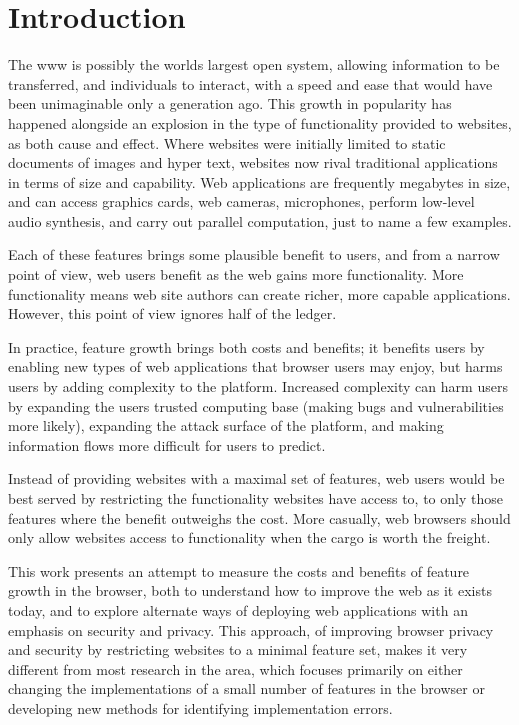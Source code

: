 \chapter{Introduction}
\label{intro}

The \gls{www} is possibly the worlds largest open system, allowing information
to be transferred, and individuals to interact, with a speed and ease that would
have been unimaginable only a generation ago.  This growth in popularity
has happened alongside an explosion in the type of functionality provided to
websites, as both cause and effect.  Where websites were initially limited
to static documents of images and hyper text, websites now rival traditional
applications in terms of size and capability.  Web applications are frequently
megabytes in size, and can access graphics cards, web cameras, microphones,
perform low-level audio synthesis, and carry out parallel computation, just to
name a few examples.

Each of these features brings some plausible benefit to users, and from a
narrow point of view, web users benefit as the web gains more functionality.
More functionality means web site authors can create richer, more capable
applications. However, this point of view ignores half of the ledger.

In practice, feature growth brings both costs and benefits; it benefits users
by enabling new types of web applications that browser users may enjoy, but
harms users by adding complexity to the platform.  Increased complexity
can harm users by expanding the users trusted computing base (making bugs and
vulnerabilities more likely), expanding the attack surface of the platform,
and making information flows more difficult for users to predict.

Instead of providing websites with a maximal set of features, web users would
be best served by restricting the functionality websites have access to,
to only those features where the benefit outweighs the cost. More casually,
web browsers should only allow websites access to functionality when
the cargo is worth the freight.

This work presents an attempt to measure the costs and benefits of feature
growth in the browser, both to understand how to improve the web as it exists
today, and to explore alternate ways of deploying web applications with
an emphasis on security and privacy.  This approach, of improving browser
privacy and security by restricting websites to a minimal feature set,
makes it very different from most research in the area, which focuses
primarily on either changing the implementations of a small number of features
in the browser or developing new methods for identifying implementation errors.





